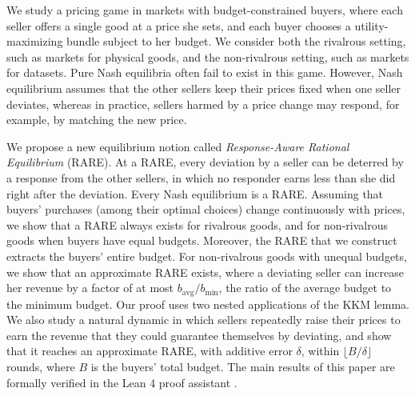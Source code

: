 We study a pricing game in markets with budget-constrained buyers, where each seller offers a single good at a price she sets, and each buyer chooses a utility-maximizing bundle subject to her budget. We consider both the rivalrous setting, such as markets for physical goods, and the non-rivalrous setting, such as markets for datasets. Pure Nash equilibria often fail to exist in this game. However, Nash equilibrium assumes that the other sellers keep their prices fixed when one seller deviates, whereas in practice, sellers harmed by a price change may respond, for example, by matching the new price.

We propose a new equilibrium notion called \emph{Response-Aware Rational Equilibrium} (RARE). At a RARE, every deviation by a seller can be deterred by a response from the other sellers, in which no responder earns less than she did right after the deviation. Every Nash equilibrium is a RARE.
Assuming that buyers' purchases (among their optimal choices) change continuously with prices, we show that a RARE always exists for rivalrous goods, and for non-rivalrous goods when buyers have equal budgets. Moreover, the RARE that we construct extracts the buyers' entire budget. For non-rivalrous goods with unequal budgets, we show that an approximate RARE exists, where a deviating seller can increase her revenue by a factor of at most $b_{\mathrm{avg}}/b_{\min}$, the ratio of the average budget to the minimum budget. Our proof uses two nested applications of the KKM lemma.
We also study a natural dynamic in which sellers repeatedly raise their prices to earn the revenue that they could guarantee themselves by deviating, and show that it reaches an approximate RARE, with additive error $\delta$, within $\lfloor B/\delta \rfloor$ rounds, where $B$ is the buyers' total budget.
The main results of this paper are formally verified in the Lean 4 proof assistant
\texorpdfstring{\cite{eklavya2026lean}}{(https://github.com/sharmaeklavya2/dm-rare)}.
